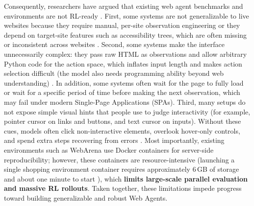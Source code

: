 \documentclass{article}
\begin{document}
Consequently, researchers have argued that existing web agent benchmarks and environments are not RL-ready \cite{chenScalingAgentLearning2025}. 
First, some systems are not generalizable to live websites because they require manual, per-site observation engineering or they depend on target-site features such as accessibility trees, which are often missing or inconsistent across websites \cite{zhouWebArenaRealisticWeb2024,yaoWebShopScalableRealWorld2022}.
Second, some systems make the interface unnecessarily complex: they pass raw HTML as observations and allow arbitrary Python code for the action space, which inflates input length and makes action selection difficult (the model also needs programming ability beyond web understanding) \cite{gurRealWorldWebAgentPlanning2023}. In addition, some systems often wait for the page to fully load or wait for a specific period of time before making the next observation, which may fail under modern Single-Page Applications (SPAs).
Third, many setups do not expose simple visual hints \cite{zhouWebArenaRealisticWeb2024,lutzWILBURAdaptiveInContext2024} that people use to judge interactivity (for example, pointer cursor on links and buttons, and text cursor on inputs).
Without these cues, models often click non-interactive elements, overlook hover-only controls, and spend extra steps recovering from errors \cite{luPromptingNotAll2025}.
Most importantly, existing environments such as WebArena \cite{zhouWebArenaRealisticWeb2024} use Docker containers for server-side reproducibility; however, these containers are resource-intensive (launching a single shopping environment container requires approximately 6\,GB of storage and about one minute to start \cite{zhouWebArenaRealisticWeb2024}), which \textbf{limits large-scale parallel evaluation and massive RL rollouts}.
Taken together, these limitations impede progress toward building generalizable and robust Web Agents.



\end{document}
